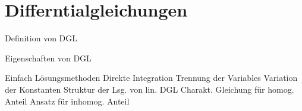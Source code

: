 \chapter{Differntialgleichungen}

Definition von DGL

Eigenschaften von DGL

Einfach Lösungsmethoden
  Direkte Integration
  Trennung der Variables
  Variation der Konstanten
  Struktur der Lsg. von lin. DGL
  Charakt. Gleichung für homog. Anteil
  Ansatz für inhomog. Anteil
